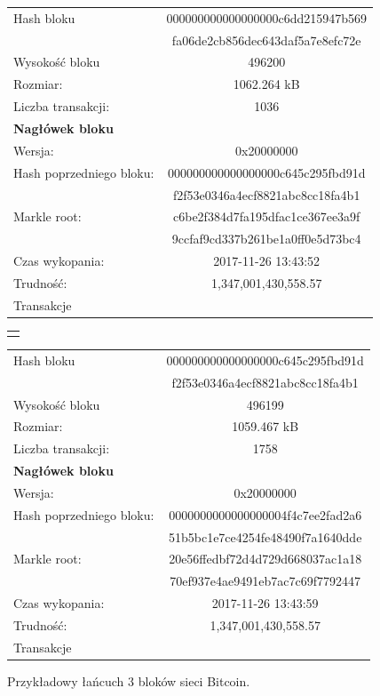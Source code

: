 \documentclass[12pt, twoside, final, openany]{mgr}
\begin{document}
\begin{figure}
	\begin{center}	
	\begin{tabular}{ | l  c | }
		\hline    
     	Hash bloku & 000000000000000000c6dd215947b569 \\
    			    & fa06de2cb856dec643daf5a7e8efc72e \\ 
    	Wysokość bloku & 496200 \\
    	Rozmiar: & 1062.264 kB \\
		Liczba transakcji: & 1036\\ \hline
		\textbf{Nagłówek bloku} & \\
   	 	Wersja: & 0x20000000 \\   	 
   	 	Hash poprzedniego bloku: & 000000000000000000c645c295fbd91d\\
   	 							 & f2f53e0346a4ecf8821abc8cc18fa4b1\\
		Markle root: 			 & c6be2f384d7fa195dfac1ce367ee3a9f\\
								 & 9ccfaf9cd337b261be1a0ff0e5d73bc4\\
   		Czas wykopania: & 2017-11-26 13:43:52\\
   		Trudność: & 1,347,001,430,558.57\\
   		\hline
   		Transakcje &\\
   		\hline 
 	\end{tabular}
 	\end{center}

	\begin{center}
	\begin{tabular}{c}
		\big\Downarrow
	\end{tabular}
	\end{center} 	

 	\begin{center}
	\begin{tabular}{ | l  c | }
		\hline   
     	Hash bloku & 000000000000000000c645c295fbd91d \\
    			    & f2f53e0346a4ecf8821abc8cc18fa4b1 \\ 
    	Wysokość bloku & 496199 \\ 
    	Rozmiar: & 1059.467 kB \\
    	Liczba transakcji: & 1758 \\ \hline
		\textbf{Nagłówek bloku} & \\
		Wersja: & 0x20000000 \\
   	 	Hash poprzedniego bloku: & 0000000000000000004f4c7ee2fad2a6\\
   	 							 & 51b5bc1e7ce4254fe48490f7a1640dde\\
		Markle root: 			 & 20e56ffedbf72d4d729d668037ac1a18 \\
								 & 70ef937e4ae9491eb7ac7c69f7792447 \\
   		Czas wykopania: & 2017-11-26 13:43:59 \\
   		Trudność: & 1,347,001,430,558.57\\
   		\hline
   		Transakcje &\\
   		\hline 
 	\end{tabular}
 	\end{center}
  	\caption{Przykładowy łańcuch 3 bloków sieci Bitcoin.}
	\label{fig:lancuchBlokow}
\end{figure}	
\end{document}
